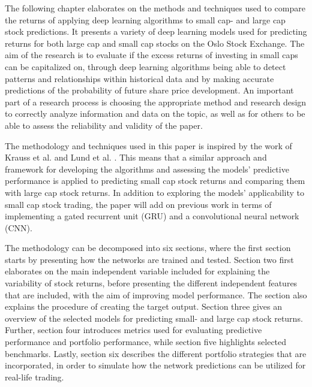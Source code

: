 The following chapter elaborates on the methods and techniques used to compare the returns of applying deep learning algorithms to small cap- and large cap stock predictions. It presents a variety of deep learning models used for predicting returns for both large cap and small cap stocks on the Oslo Stock Exchange. The aim of the research is to evaluate if the excess returns of investing in small caps can be capitalized on, through deep learning algorithms being able to detect patterns and relationships within historical data and by making accurate predictions of the probability of future share price development. An important part of a research process is choosing the appropriate method and research design to correctly analyze information and data on the topic, as well as for others to be able to assess the reliability and validity of the paper. 

\indent\newline
The methodology and techniques used in this paper is inspired by the work of Krauss et al. and Lund et al. \cite{krauss} \cite{lund}. This means that a similar approach and framework for developing the algorithms and assessing the models' predictive performance is applied to predicting small cap stock returns and comparing them with large cap stock returns. In addition to exploring the models' applicability to small cap stock trading, the paper will add on previous work in terms of implementing a gated recurrent unit (GRU) and a convolutional neural network (CNN).   

\indent\newline
The methodology can be decomposed into six sections, where the first section starts by presenting how the networks are trained and tested. Section two first elaborates on the main independent variable included for explaining the variability of stock returns, before presenting the different independent features that are included, with the aim of improving model performance. The section also explains the procedure of creating the target output. Section three gives an overview of the selected models for predicting small- and large cap stock returns. Further, section four introduces metrics used for evaluating predictive performance and portfolio performance, while section five highlights selected benchmarks. Lastly, section six describes the different portfolio strategies that are incorporated, in order to simulate how the network predictions can be utilized for real-life trading. 

